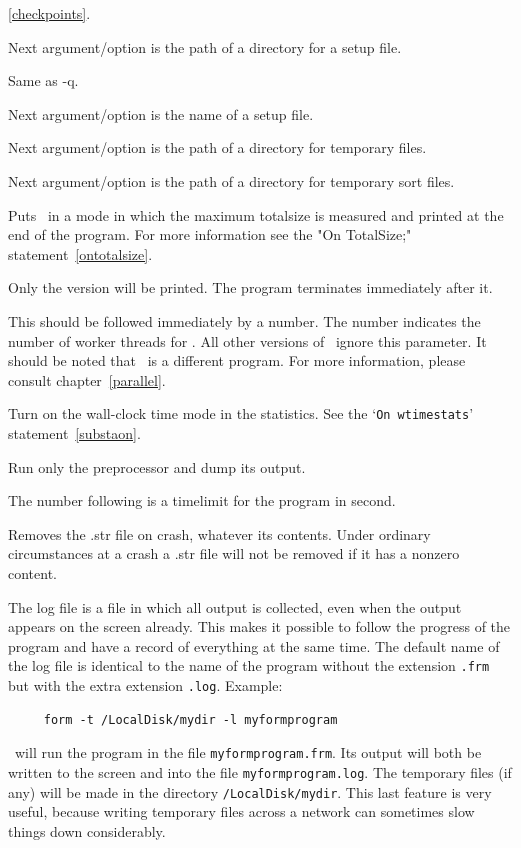 \begin{description}
     \ref{checkpoints}.
\item[-s] Next argument/option is the path of a directory for a 
     setup file.
\item[-si] Same as -q.
\item[-S] Next argument/option is the name of a setup file.
\item[-t] Next argument/option is the path of a directory for temporary files.
\item[-ts] Next argument/option is the path of a directory for temporary sort 
     files.
\item[-T] Puts \FORM\ in a mode in which the maximum 
     totalsize is measured and printed at the end of the program. For more 
     information see the "On TotalSize;" statement~\ref{ontotalsize}.
\item[-v] Only the version will be printed. The program terminates 
     immediately after it.
\item[-w] This should be followed immediately by a number. The 
     number indicates the number of worker threads for \TFORM. All other 
     versions of \FORM\ ignore this parameter. It should be noted that \TFORM\ 
     is a different program. For more information, please consult 
     chapter~\ref{parallel}.
\item[-W] Turn on the wall-clock time mode in the statistics. 
     See the `\texttt{On wtimestats}' statement~\ref{substaon}.
\item[-y] Run only the preprocessor and dump its output.
\item[-z] The number following is a timelimit for the program in second.
\item[-Z] Removes the .str file on crash, whatever its contents. Under 
     ordinary circumstances at a crash a .str file will not be removed if 
     it has a nonzero content.
\end{description}

\noindent The log file is a file in which all 
output is collected, even when the output appears on the screen already. 
This makes it possible to follow the progress of the program and have a 
record of everything at the same time. The default name of the log file is 
identical to the name of the program without the extension \verb:.frm: but 
with the extra extension \verb:.log:.
Example:
\begin{center}
\begin{verbatim}
     form -t /LocalDisk/mydir -l myformprogram
\end{verbatim}
\end{center}
\FORM\ will run the program in the file \verb:myformprogram.frm:. Its output 
will both be written to the screen and into the file 
\verb:myformprogram.log:. The temporary files (if any) will be made in the 
directory \verb:/LocalDisk/mydir:. This last feature is very useful, 
because writing temporary files across a network can sometimes slow things 
down considerably.

